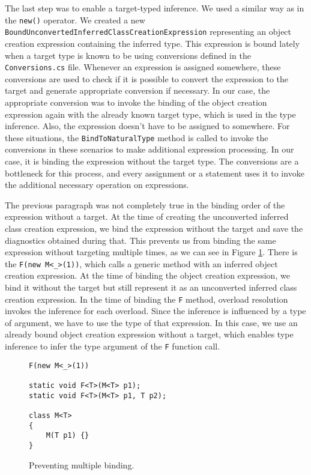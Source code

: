 \par
The last step was to enable a target-typed inference. 
We used a similar way as in the \texttt{new()} operator. We created a new\\ \texttt{BoundUnconvertedInferredClassCreationExpression} representing an object creation expression containing the inferred type. 
This expression is bound lately when a target type is known to be using conversions defined in the \texttt{Conversions.cs} file. 
Whenever an expression is assigned somewhere, these conversions are used to check if it is possible to convert the expression to the target and generate appropriate conversion if necessary. 
In our case, the appropriate conversion was to invoke the binding of the object creation expression again with the already known target type, which is used in the type inference. 
Also, the expression doesn’t have to be assigned to somewhere. 
For these situations, the \texttt{BindToNaturalType} method is called to invoke the conversions in these scenarios to make additional expression processing. 
In our case, it is binding the expression without the target type. 
The conversions are a bottleneck for this process, and every assignment or a statement uses it to invoke the additional necessary operation on expressions.
\par
The previous paragraph was not completely true in the binding order of the expression without a target. 
At the time of creating the unconverted inferred class creation expression, we bind the expression without the target and save the diagnostics obtained during that. 
This prevents us from binding the same expression without targeting multiple times, as we can see in Figure \ref{img71:binding}. 
There is the \texttt{F(new M<\_>(1))}, which calls a generic method with an inferred object creation expression. 
At the time of binding the object creation expression, we bind it without the target but still represent it as an unconverted inferred class creation expression. 
In the time of binding the \texttt{F} method, overload resolution invokes the inference for each overload.
Since the inference is influenced by a type of argument, we have to use the type of that expression.
In this case, we use an already bound object creation expression without a target, which enables type inference to infer the type argument of the \texttt{F} function call. 
\begin{figure}[h]
\begin{lstlisting}[style=csharp, showstringspaces=false]
F(new M<_>(1))

static void F<T>(M<T> p1);
static void F<T>(M<T> p1, T p2);

class M<T> 
{
    M(T p1) {}
}
\end{lstlisting}
\caption{Preventing multiple binding.}
\label{img71:binding}
\end{figure}
